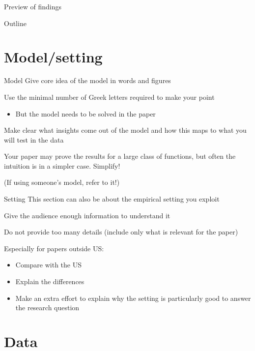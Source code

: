 \documentclass[aspectratio=169, 11pt]{beamer}
\newcommand{\ToCslide}{\bgroup\setbeamertemplate{footline}{}%
\addtocounter{framenumber}{-1}%
\begin{frame}{Outline}%
\tableofcontents%
\end{frame}\egroup}
\begin{document}
\begin{frame}{Preview of findings}
    
\end{frame}

\ToCslide

\section{Model/setting}

\begin{frame}{Model}
    Give core idea of the model in words and figures
    
    Use the minimal number of Greek letters required to make your point\\
    \begin{itemize}
        \item But the model needs to be solved in the paper
    \end{itemize}
    
    Make clear what insights come out of the model and how this maps to what you will test in the data
    
    Your paper may prove the results for a large class of functions, but often the intuition is in a simpler case. Simplify!
    
    \small (If using someone's model, refer to it!)
\end{frame}

\begin{frame}{Setting}
    This section can also be about the empirical setting you exploit
    
    Give the audience enough information to understand it
    
    Do not provide too many details (include only what is relevant for the paper)
    
    Especially for papers outside US:\\
    \begin{itemize}
        \item Compare with the US
        \item Explain the differences
        \item Make an extra effort to explain why the setting is particularly good to answer the research question
    \end{itemize}
\end{frame}

\section{Data}
\end{document}
